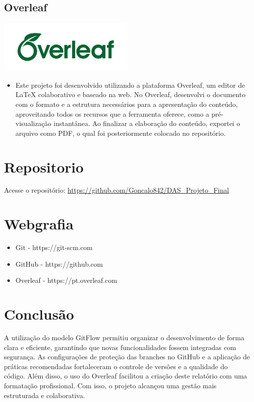 \documentclass[a4paper,12pt]{article}
\begin{document}
\subsection{Overleaf}
\includegraphics[width=0.5\textwidth]{overleaf.jpg}
    \vspace{1cm}
    \vspace{0.5cm}
    \begin{itemize}
        \item Este projeto foi desenvolvido utilizando a plataforma Overleaf, um editor de LaTeX colaborativo e baseado na web. No Overleaf, desenvolvi o documento com o formato e a estrutura necessários para a apresentação do conteúdo, aproveitando todos os recursos que a ferramenta oferece, como a pré-visualização instantânea. Ao finalizar a elaboração do conteúdo, exportei o arquivo como PDF, o qual foi posteriormente colocado no repositório.
    \end{itemize}


\section{Repositorio}

Acesse o repositório: \url{https://github.com/Goncalo842/DAS_Projeto_Final}

\section{Webgrafia}
  \begin{itemize}
  \item Git - https://git-scm.com
  \item GitHub - https://github.com
  \item Overleaf - https://pt.overleaf.com
\end{itemize}





\section{Conclusão}
A utilização do modelo GitFlow permitiu organizar o desenvolvimento de forma clara e eficiente, garantindo que novas funcionalidades fossem integradas com segurança. As configurações de proteção das branches no GitHub e a aplicação de práticas recomendadas fortaleceram o controle de versões e a qualidade do código. Além disso, o uso do Overleaf facilitou a criação deste relatório com uma formatação profissional. Com isso, o projeto alcançou uma gestão mais estruturada e colaborativa.
\end{document}
